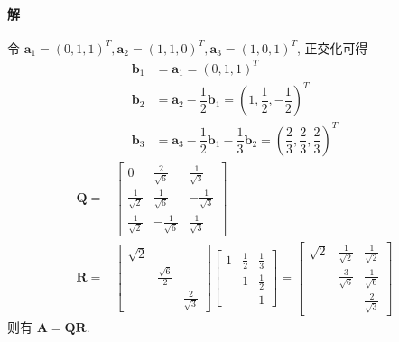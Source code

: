 \documentclass[12pt, a4paper, oneside, fontset=none]{ctexart}
\begin{document}
\paragraph*{解} 令 $\bm{a}_1 = (0,1,1)^T, \bm{a}_2 = (1,1,0)^T, \bm{a}_3 = (1,0,1)^T$, 正交化可得
\begin{align*}
    \bm{b}_1 & =  \bm{a}_1 = (0, 1, 1)^T                                                                                \\
    \bm{b}_2 & =  \bm{a}_2 - \dfrac{1}{2}\bm{b}_1 = (1, \dfrac{1}{2}, -\dfrac{1}{2})^T                                  \\
    \bm{b}_3 & =  \bm{a}_3 - \dfrac{1}{2}\bm{b}_1 - \dfrac{1}{3}\bm{b}_2 = (\dfrac{2}{3}, \dfrac{2}{3}, \dfrac{2}{3})^T
\end{align*}
\begin{align*}
    \bm{Q} = & \begin{bmatrix}
                   0                  & \frac{2}{\sqrt{6}}  & \frac{1}{\sqrt{3}}  \\
                   \frac{1}{\sqrt{2}} & \frac{1}{\sqrt{6}}  & -\frac{1}{\sqrt{3}} \\
                   \frac{1}{\sqrt{2}} & -\frac{1}{\sqrt{6}} & \frac{1}{\sqrt{3}}
               \end{bmatrix} \\
    \bm{R} = & \begin{bmatrix}
                   \sqrt{2} &                    &                    \\
                            & \frac{\sqrt{6}}{2} &                    \\
                            &                    & \frac{2}{\sqrt{3}}
               \end{bmatrix}
    \begin{bmatrix}
        1 & \frac{1}{2} & \frac{1}{3} \\
          & 1           & \frac{1}{2} \\
          &             & 1
    \end{bmatrix} =
    \begin{bmatrix}
        \sqrt{2} & \frac{1}{\sqrt{2}} & \frac{1}{\sqrt{2}} \\
                 & \frac{3}{\sqrt{6}} & \frac{1}{\sqrt{6}} \\
                 &                    & \frac{2}{\sqrt{3}}
    \end{bmatrix}
\end{align*}
则有 $\bm{A} = \bm{QR}$.
\end{document}
